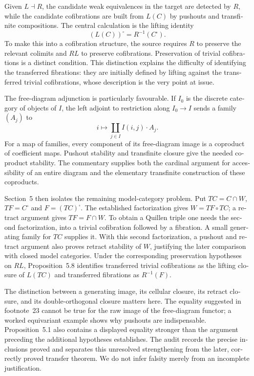 \begin{otherlanguage}{english}
Given $L\dashv R$, the candidate weak equivalences in the target are detected by $R$, while the candidate cofibrations are built from $L(C)$ by pushouts and transfinite compositions. The central calculation is the lifting identity
\[
 (L(C))^{\square}=R^{-1}(C^{\square}).
\]
To make this into a cofibration structure, the source requires $R$ to preserve the relevant colimits and $RL$ to preserve cofibrations. Preservation of trivial cofibrations is a distinct condition. This distinction explains the difficulty of identifying the transferred fibrations: they are initially defined by lifting against the transferred trivial cofibrations, whose description is the very point at issue.

The free-diagram adjunction is particularly favourable. If $I_0$ is the discrete category of objects of $I$, the left adjoint to restriction along $I_0\to I$ sends a family $(A_j)$ to
\[
 i\longmapsto\coprod_{j\in I} I(i,j)\cdot A_j.
\]
For a map of families, every component of its free-diagram image is a coproduct of coefficient maps. Pushout stability and transfinite closure give the needed coproduct stability. The commentary supplies both the cardinal argument for accessibility of an entire diagram and the elementary transfinite construction of these coproducts.

Section~5 then isolates the remaining model-category problem. Put $TC=C\cap W$, $TF=C^{\square}$ and $F=(TC)^{\square}$. The established factorization gives $W=TF\circ TC$; a retract argument gives $TF=F\cap W$. To obtain a Quillen triple one needs the second factorization, into a trivial cofibration followed by a fibration. A small generating family for $TC$ supplies it. With this second factorization, a pushout and retract argument also proves retract stability of $W$, justifying the later comparison with closed model categories. Under the corresponding preservation hypotheses on $RL$, Proposition~5.8 identifies transferred trivial cofibrations as the lifting closure of $L(TC)$ and transferred fibrations as $R^{-1}(F)$.

The distinction between a generating image, its cellular closure, its retract closure, and its double-orthogonal closure matters here. The equality suggested in footnote~23 cannot be true for the raw image of the free-diagram functor; a worked equivariant example shows why pushouts are indispensable. Proposition~5.1 also contains a displayed equality stronger than the argument preceding the additional hypotheses establishes. The audit records the precise inclusions proved and separates this unresolved strengthening from the later, correctly proved transfer theorem. We do not infer falsity merely from an incomplete justification.


\end{otherlanguage}
